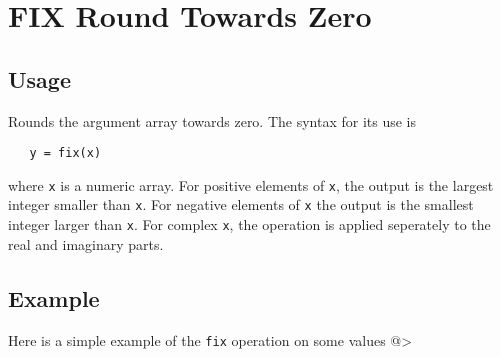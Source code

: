 \section{FIX Round Towards Zero}

\subsection{Usage}

Rounds the argument array towards zero.  The syntax for its use is
\begin{verbatim}
   y = fix(x)
\end{verbatim}
where \verb|x| is a numeric array.  For positive elements of \verb|x|, the output
is the largest integer smaller than \verb|x|.  For negative elements of \verb|x|
the output is the smallest integer larger than \verb|x|.  For complex \verb|x|,
the operation is applied seperately to the real and imaginary parts.
\subsection{Example}

Here is a simple example of the \verb|fix| operation on some values
@>
